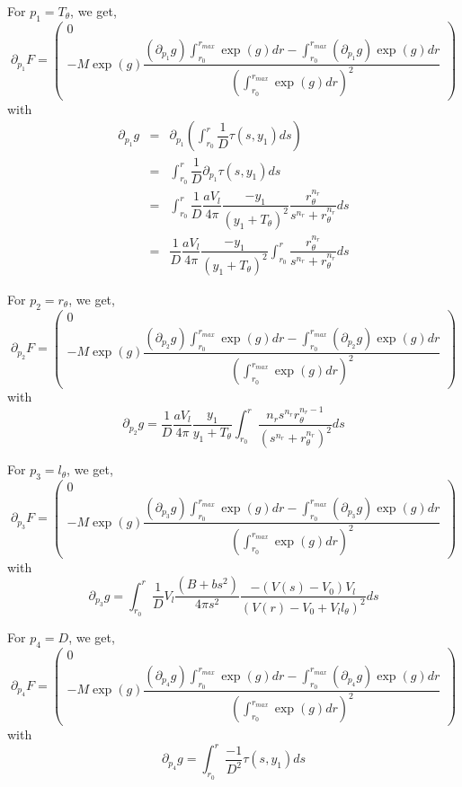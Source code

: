 \documentclass[11pt,a4paper]{article}
\begin{document}
\noindent
For $ p_1 = T_{\theta} $, we get, 
$$\partial_{p_1} F = \begin{pmatrix} 
0 \\ 
\displaystyle -M \exp(g) \dfrac{ (\partial_{p_1}g) \int_{r_{0}}^{r_{max}} \exp (g) dr - \int_{r_{0}}^{r_{max}} (\partial_{p_1}g) \exp (g) dr }{\left( \int_{r_{0}}^{r_{max}} \exp (g) dr \right)^2}
\end{pmatrix} 
$$
with $$\begin{array}{rcl}
\partial_{p_1}g & = & \displaystyle \partial_{p_1} \left( \int_{r_{0}}^{r} \dfrac{1}{D} \tau(s, y_1) ds \right)\\
& = & \displaystyle \int_{r_{0}}^{r} \dfrac{1}{D} \partial_{p_1}\tau(s, y_1) ds \\
& = & \displaystyle \int_{r_{0}}^{r} \dfrac{1}{D} \dfrac{aV_l}{4\pi}  \dfrac{-y_1}{(y_1 + T_{\theta})^2} \dfrac{r_{\theta}^{n_r}}{s^{n_r}+ r_{\theta}^{n_r}} ds  \\
& = & \dfrac{1}{D} \dfrac{aV_l}{4\pi}  \dfrac{-y_1}{(y_1 + T_{\theta})^2} \displaystyle \int_{r_{0}}^{r}  \dfrac{r_{\theta}^{n_r}}{s^{n_r}+ r_{\theta}^{n_r}} ds 
\end{array}$$


\noindent
For $ p_2 = r_{\theta} $, we get, 
$$\partial_{p_2} F = \begin{pmatrix} 
0 \\ 
\displaystyle -M \exp(g) \dfrac{ (\partial_{p_2}g) \int_{r_{0}}^{r_{max}} \exp (g) dr - \int_{r_{0}}^{r_{max}} (\partial_{p_2}g) \exp (g) dr }{\left( \int_{r_{0}}^{r_{max}} \exp (g) dr \right)^2}
\end{pmatrix} 
$$
with $$ \partial_{p_2}g  = \dfrac{1}{D} \dfrac{aV_l}{4\pi}  \dfrac{y_1}{y_1 + T_{\theta}} \displaystyle \int_{r_{0}}^{r} \dfrac{n_r s^{n_r} r_{\theta}^{n_r - 1}}{(s^{n_r}+ r_{\theta}^{n_r})^2} ds $$



\noindent
For $ p_3 = l_{\theta} $, we get, 
$$\partial_{p_3} F = \begin{pmatrix} 
0 \\ 
\displaystyle -M \exp(g) \dfrac{ (\partial_{p_3}g) \int_{r_{0}}^{r_{max}} \exp (g) dr - \int_{r_{0}}^{r_{max}} (\partial_{p_3}g) \exp (g) dr }{\left( \int_{r_{0}}^{r_{max}} \exp (g) dr \right)^2}
\end{pmatrix} 
$$
with $$ \partial_{p_3}g  =  \displaystyle \int_{r_{0}}^{r} \dfrac{1}{D} V_l \dfrac{(B + bs^2)}{4\pi s^2} \dfrac{-(V(s) - V_0)V_l}{(V(r) - V_0 + V_l  l_{\theta})^2} ds $$


\noindent
For $ p_4 = D $, we get, 
$$\partial_{p_4} F = \begin{pmatrix} 
0 \\ 
\displaystyle -M \exp(g) \dfrac{ (\partial_{p_4}g) \int_{r_{0}}^{r_{max}} \exp (g) dr - \int_{r_{0}}^{r_{max}} (\partial_{p_4}g) \exp (g) dr }{\left( \int_{r_{0}}^{r_{max}} \exp (g) dr \right)^2}
\end{pmatrix} 
$$
with $$ \partial_{p_4}g  =  \displaystyle \int_{r_{0}}^{r} \dfrac{-1}{D^2} \tau(s, y_1) ds $$
\end{document}
